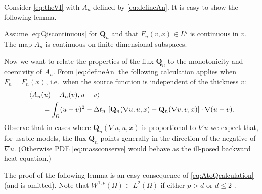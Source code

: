 \documentclass[final,onefignum]{siamart190516}
\newcommand\bQ{\mathbf{Q}}
\newcommand{\grad}{\nabla}
\newcommand{\ip}[2]{\ensuremath{\left<#1,#2\right>}}
\newcommand\RR{\mathbb{R}}
\begin{document}
Consider \eqref{eq:theVI} with $A_n$ defined by \eqref{eq:defineAn}.  It is easy to show the following lemma.

\begin{lemma}  \label{lem:continuous}  Assume \eqref{eq:Qiscontinuous} for $\bQ_n$ and that $F_n(v,x)\in L^q$ is continuous in $v$.  The map $A_n$ is continuous on finite-dimensional subspaces.
\end{lemma}


Now we want to relate the properties of the flux $\bQ_n$ to the monotonicity and coercivity of $A_n$.  From \eqref{eq:defineAn} the following calculation applies when $F_n=F_n(x)$, i.e.~when the source function is independent of the thickness $v$:
\begin{align}
   &\ip{A_n(u) - A_n(v)}{u-v}  \label{eq:AtoQcalculation} \\
   &\qquad = \int_\Omega (u-v)^2 - \Delta t_n\, \left[\bQ_n(\grad u,u,x) - \bQ_n(\grad v,v,x)\right] \cdot \grad(u-v).  \notag
\end{align}
Observe that in cases where $\bQ_n(\grad u,u,x)$ is proportional to $\grad u$ we expect that, for usable models, the flux $\bQ_n$ points generally in the direction of the negative of $\grad u$.  (Otherwise PDE \eqref{eq:massconserve} would behave as the ill-posed backward heat equation.)

The proof of the following lemma is an easy consequence of \eqref{eq:AtoQcalculation} (and is omitted).  Note that $W^{1,p}(\Omega) \subset L^2(\Omega)$ if either $p>d$ or $d\le 2$ \cite[theorems 5.6.2 and 5.6.5]{Evans2010}.
\end{document}
